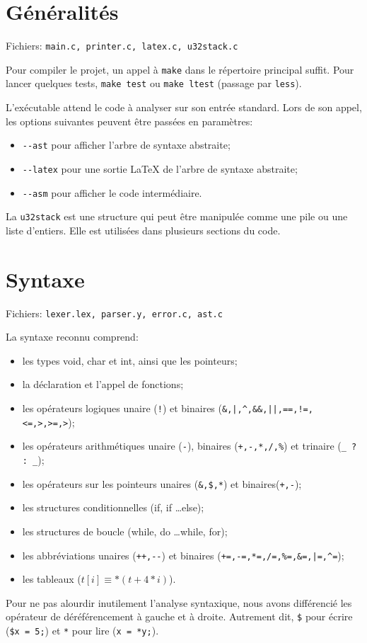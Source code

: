 \documentclass{article}
\begin{document}
	\section{Généralités}
		\par Fichiers: \verb#main.c, printer.c, latex.c, u32stack.c#
		\par Pour compiler le projet, un appel à \verb#make# dans le répertoire principal suffit. Pour lancer quelques tests, \verb#make test# ou \verb#make ltest# (passage par \verb#less#).
		\par L'exécutable attend le code à analyser sur son entrée standard. Lors de son appel, les options suivantes peuvent être passées en paramètres:
		\begin{itemize}
			\item \verb#--ast# pour afficher l'arbre de syntaxe abstraite;
			\item \verb#--latex# pour une sortie LaTeX de l'arbre de syntaxe abstraite;
			\item \verb#--asm# pour afficher le code intermédiaire.
		\end{itemize}
		\par La \verb#u32stack# est une structure qui peut être manipulée comme une pile ou une liste d'entiers. Elle est utilisées dans plusieurs sections du code.
	\section{Syntaxe}
		\par Fichiers: \verb#lexer.lex, parser.y, error.c, ast.c#
		\par La syntaxe reconnu comprend:
		\begin{itemize}
			\item les types void, char et int, ainsi que les pointeurs;
			\item la déclaration et l'appel de fonctions;
			\item les opérateurs logiques unaire (\verb#!#) et binaires (\verb#&,|,^,&&,||,==,!=,<=,>,>=,>#);
			\item les opérateurs arithmétiques unaire (\verb#-#), binaires (\verb#+,-,*,/,%#) et trinaire (\verb#_ ? : _#);
			\item les opérateurs sur les pointeurs unaires (\verb#&,$,*#) et binaires(\verb#+,-#);
			\item les structures conditionnelles (if, if \dots else);
			\item les structures de boucle (while, do \dots while, for);
			\item les abbréviations unaires (\verb#++,--#) et binaires (\verb#+=,-=,*=,/=,%=,&=,|=,^=#);
			\item les tableaux ($t[i] \equiv *(t + 4*i)$).
		\end{itemize}
		\par Pour ne pas alourdir inutilement l'analyse syntaxique, nous avons différencié les opérateur de déréférencement à gauche et à droite. Autrement dit, \verb#$# pour écrire (\verb#$x = 5;#) et \verb#*# pour lire (\verb#x = *y;#).
\end{document}

